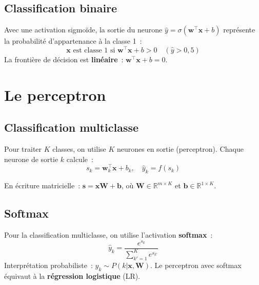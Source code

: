 \documentclass[a4paper,11pt]{article}
\theoremstyle{definition}
\theoremstyle{remark}
\begin{document}
\subsection{Classification binaire}

Avec une activation sigmo\"ide, la sortie du neurone
$\hat{y} = \sigma(\mathbf{w}^\intercal \mathbf{x} + b)$ repr\'esente
la probabilit\'e d'appartenance \`a la classe 1~:
\begin{equation}
  \mathbf{x} \text{ est classe 1 si } \mathbf{w}^\intercal
  \mathbf{x} + b > 0 \quad (\hat{y} > 0{,}5)
\end{equation}
La fronti\`ere de d\'ecision est \textbf{lin\'eaire}~:
$\mathbf{w}^\intercal \mathbf{x} + b = 0$.

\section{Le perceptron}

\subsection{Classification multiclasse}

Pour traiter $K$ classes, on utilise $K$ neurones en sortie
(perceptron). Chaque neurone de sortie $k$ calcule~:
\begin{equation}
  s_k = \mathbf{w}_k^\intercal \mathbf{x} + b_k,
  \quad \hat{y}_k = f(s_k)
\end{equation}

\noindent En \'ecriture matricielle~:
$\mathbf{s} = \mathbf{x} \mathbf{W} + \mathbf{b}$,
o\`u $\mathbf{W} \in \mathbb{R}^{m \times K}$ et
$\mathbf{b} \in \mathbb{R}^{1 \times K}$.

\subsection{Softmax}

Pour la classification multiclasse, on utilise l'activation
\textbf{softmax}~:
\begin{equation}
  \hat{y}_k = \frac{e^{s_k}}{\sum_{k'=1}^K e^{s_{k'}}}
\end{equation}
Interpr\'etation probabiliste~: $\hat{y}_k \sim P(k|\mathbf{x},
\mathbf{W})$. Le perceptron avec softmax \'equivaut \`a la
\textbf{r\'egression logistique} (LR).
\end{document}
